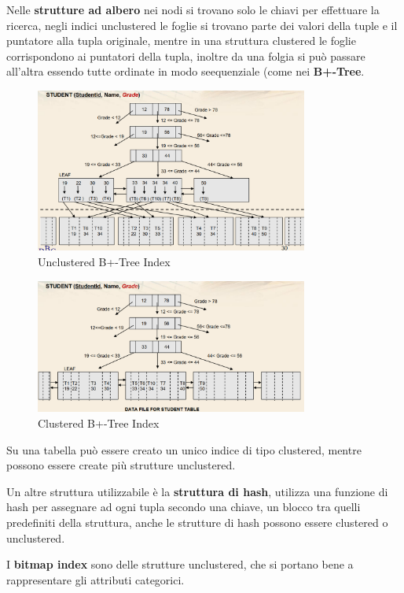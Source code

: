 \documentclass[12pt]{article}
\begin{document}
Nelle \textbf{strutture ad albero} nei nodi si trovano solo le chiavi per effettuare la ricerca, negli indici unclustered le foglie si trovano parte dei valori della tuple e il puntatore alla tupla originale, mentre in una struttura clustered le foglie corrispondono ai puntatori della tupla, inoltre da una folgia si pu\`o passare all'altra essendo tutte ordinate in modo seequenziale (come nei \textbf{B+-Tree}.
\begin{figure}[H]
    \centering
    \includegraphics[width=0.8\textwidth]{unclustered-b-tree.png}
    \caption{Unclustered B+-Tree Index}
    \label{fig:unclustered-b-tree}
\end{figure}
\begin{figure}[H]
    \centering
    \includegraphics[width=0.8\textwidth]{clustered-b-tree.png}
    \caption{Clustered B+-Tree Index}
    \label{fig:clustered-b-tree}
\end{figure}
Su una tabella pu\`o essere creato un unico indice di tipo clustered, mentre possono essere create pi\`u strutture unclustered.


Un altre struttura utilizzabile \`e la \textbf{struttura di hash}, utilizza una funzione di hash per assegnare ad ogni tupla secondo una chiave, un blocco tra quelli predefiniti della struttura, anche le strutture di hash possono essere clustered o unclustered.


I \textbf{bitmap index} sono delle strutture unclustered, che si portano bene a rappresentare gli attributi categorici.
\end{document}
